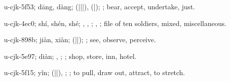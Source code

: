 \begin{multicols}{2}
{\cjkgGlue{}u-cjk-5f53; dāng, dàng; \cjkgGlue{}\cjkgGlue{}(\cjkgGlue{}|\cjkgGlue{}|\cjkgGlue{}|\cjkgGlue{}), \cjkgGlue{}\cjkgGlue{}(\cjkgGlue{}|\cjkgGlue{}); \cjkgGlue{}; bear, accept, undertake, just.

\cjkgGlue{}u-cjk-4ec0; shí, shén, shé; \cjkgGlue{}, \cjkgGlue{}, \cjkgGlue{}; \cjkgGlue{}, \cjkgGlue{}; file of ten soldiers, mixed, miscellaneous.

\cjkgGlue{}u-cjk-898b; jiàn, xiàn; \cjkgGlue{}\cjkgGlue{}(\cjkgGlue{}|\cjkgGlue{}|\cjkgGlue{}); \cjkgGlue{}; see, observe, perceive.

\cjkgGlue{}u-cjk-5e97; diàn; \cjkgGlue{}, \cjkgGlue{}; \cjkgGlue{}; shop, store, inn, hotel.

\cjkgGlue{}u-cjk-5f15; yǐn; \cjkgGlue{}\cjkgGlue{}(\cjkgGlue{}|\cjkgGlue{}|\cjkgGlue{}), \cjkgGlue{}\cjkgGlue{}\cjkgGlue{}; \cjkgGlue{}; to pull, draw out, attract, to stretch.

}
\end{multicols}
